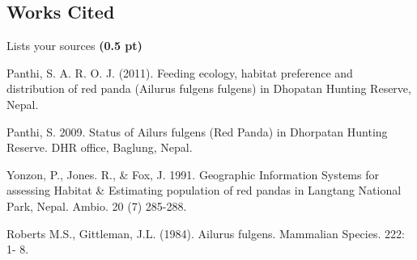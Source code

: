 \documentclass[12pt,a4paper]{article}
\begin{document}
\subsection*{Works Cited}
\begin{enumerate}[font=\bfseries, wide, resume]

{\color{under}\item Lists your sources \textbf{(0.5 pt)}}

Panthi, S. A. R. O. J. (2011). Feeding ecology, habitat preference and distribution of red panda (Ailurus fulgens fulgens) in Dhopatan Hunting Reserve, Nepal.

Panthi, S. 2009. Status of Ailurs fulgens (Red Panda) in Dhorpatan Hunting Reserve. DHR office, Baglung, Nepal.

Yonzon, P., Jones. R., \& Fox, J. 1991. Geographic Information Systems for assessing Habitat \& Estimating population of red pandas in Langtang National Park, Nepal. Ambio. 20 (7) 285-288.

Roberts M.S., Gittleman, J.L. (1984). Ailurus fulgens. Mammalian Species. 222: 1- 8.
\end{enumerate}
\end{document}
